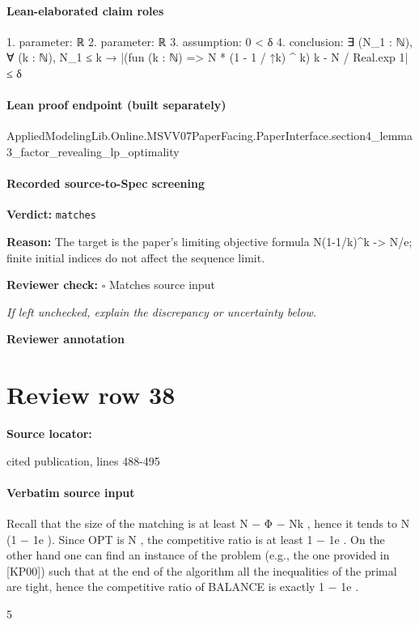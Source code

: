 \documentclass[10pt]{article}
\newcommand{\reviewerbox}{%
  \par\noindent\fbox{\parbox{0.96\linewidth}{\rule{0pt}{0.38in}}}\par
}
\newcommand{\reviewmatch}[1]{%
  \par\noindent\textbf{Reviewer check:} $\square$\; #1\par
  \noindent\emph{If left unchecked, explain the discrepancy or uncertainty below.}\par
}
\begin{document}
\paragraph{Lean-elaborated claim roles}\begin{ReviewVerbatim}
1. parameter: ℝ
2. parameter: ℝ
3. assumption: 0 < δ
4. conclusion: ∃ (N_1 : ℕ), ∀ (k : ℕ), N_1 ≤ k → |(fun (k : ℕ) => N * (1 - 1 / ↑k) ^ k) k - N / Real.exp 1| ≤ δ
\end{ReviewVerbatim}

\paragraph{Lean proof endpoint (built separately)}\begin{ReviewVerbatim}
AppliedModelingLib.Online.MSVV07PaperFacing.PaperInterface.section4_lemma3_factor_revealing_lp_optimality
\end{ReviewVerbatim}

\paragraph{Recorded source-to-Spec screening}
\textbf{Verdict:} \texttt{matches}
\\
{\raggedright
\textbf{Reason:} The target is the paper's limiting objective formula N(1-\allowbreak{}1/\allowbreak{}k)\textasciicircum{}k -\allowbreak{}> N/\allowbreak{}e;\allowbreak{} finite initial indices do not affect the sequence limit.\allowbreak{}
\par}
\reviewmatch{Matches source input}
\noindent\textbf{Reviewer annotation}\par
\reviewerbox
\clearpage
\hypertarget{source-claim-5de8039797e4d932}{}
\section*{Review row 38}
\textbf{Source locator:} {\footnotesize\raggedright cited publication, lines 488-\allowbreak{}495\par}
\paragraph{Verbatim source input}
\begin{ReviewVerbatim}
Recall that the size of the matching is at least N − Φ − Nk , hence it tends to N (1 − 1e ). Since
OPT is N , the competitive ratio is at least 1 − 1e .
On the other hand one can find an instance of the problem (e.g., the one provided in [KP00])
such that at the end of the algorithm all the inequalities of the primal are tight, hence the
competitive ratio of BALANCE is exactly 1 − 1e .

5
\end{ReviewVerbatim}
\end{document}
